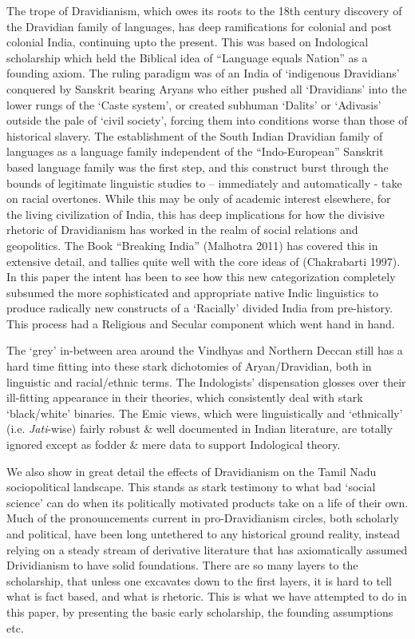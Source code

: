 The trope of Dravidianism, which owes its roots to the 18th century discovery of the Dravidian family of languages, has deep ramifications for colonial and post colonial India, continuing upto the present. This was based on Indological scholarship which held the Biblical idea of “Language equals Nation” as a founding axiom. The ruling paradigm was of an India of ‘indigenous Dravidians’ conquered by Sanskrit bearing Aryans who either pushed all ‘Dravidians’ into the lower rungs of the ‘Caste system’, or created subhuman ‘Dalits’ or ‘Adivasis’ outside the pale of ‘civil society’, forcing them into conditions worse than those of historical slavery. The establishment of the South Indian Dravidian family of languages as a language family independent of the “Indo-European” Sanskrit based language family was the first step, and this construct burst through the bounds of legitimate linguistic studies to – immediately and automatically - take on racial overtones. While this may be only of academic interest elsewhere, for the living civilization of India, this has deep implications for how the divisive rhetoric of Dravidianism has worked in the realm of social relations and geopolitics. The Book “Breaking India” (Malhotra 2011) has covered this in extensive detail, and tallies quite well with the core ideas of (Chakrabarti 1997). In this paper the intent has been to see how this new categorization completely subsumed the more sophisticated and appropriate native Indic linguistics to produce radically new constructs of a ‘Racially’ divided India from pre-history. This process had a Religious and Secular component which went hand in hand.

The ‘grey’ in-between area around the Vindhyas and Northern Deccan still has a hard time fitting into these stark dichotomies of Aryan/Dravidian, both in linguistic and racial/ethnic terms. The Indologists’ dispensation glosses over their ill-fitting appearance in their theories, which consistently deal with stark ‘black/white’ binaries. The Emic views, which were linguistically and ‘ethnically’ (i.e. \textit{Jati}-wise) fairly robust \& well documented in Indian literature, are totally ignored except as fodder \& mere data to support Indological theory.

We also show in great detail the effects of Dravidianism on the Tamil Nadu sociopolitical landscape. This stands as stark testimony to what bad ‘social science’ can do when its politically motivated products take on a life of their own. Much of the pronouncements current in pro-Dravidianism circles, both scholarly and political, have been long untethered to any historical ground reality, instead relying on a steady stream of derivative literature that has axiomatically assumed Drividianism to have solid foundations. There are so many layers to the scholarship, that unless one excavates down to the first layers, it is hard to tell what is fact based, and what is rhetoric. This is what we have attempted to do in this paper, by presenting the basic early scholarship, the founding assumptions etc.

